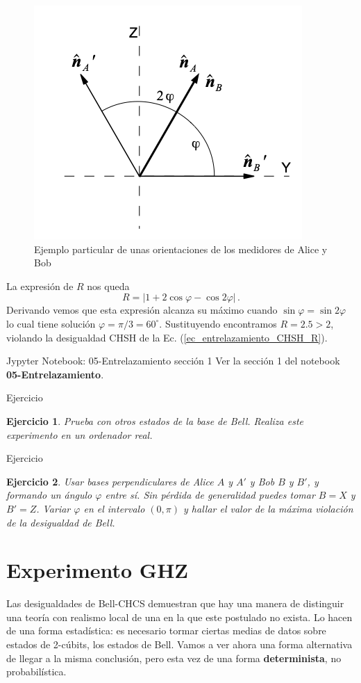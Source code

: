 \documentclass[a4paper,11pt]{book} %
\newtheorem{ejercicio_contador}{Ejercicio}
\newcommand{\Ejercicio}[1]{
		\begin{mybox_gray}{Ejercicio} 
			\begin{ejercicio_contador}
				 #1 
			\end{ejercicio_contador} 
		\end{mybox_gray}
	}
\numberwithin{equation}{chapter}
\begin{document}
	\begin{figure}[t]
	\centering 
	\includegraphics[width=0.35\linewidth]{Figuras/Fig_entrelazamiento_CHSH_basis}
	\caption{Ejemplo particular de unas orientaciones de los medidores de Alice y Bob}
	\label{Fig_entrelazamiento_CHSH_basis}
	\end{figure}

La expresión de $R$ nos queda
$$
R = |1 +  2 \cos\varphi  - \cos 2\varphi|\, .
$$
Derivando vemos que esta expresión alcanza su máximo cuando $\sin\varphi = \sin 2\varphi$ lo cual tiene solución $\varphi = \pi/3 = 60^\circ$. Sustituyendo encontramos $R= 2.5>2$, violando la desigualdad CHSH de la Ec. (\ref{ec_entrelazamiento_CHSH_R}).

	\begin{mybox_orange}{Jypyter Notebook: 05-Entrelazamiento sección 1}
	Ver la sección 1 del notebook \textbf{05-Entrelazamiento}.
	\end{mybox_orange}
	
	\Ejercicio{
	Prueba con otros estados de la base de Bell. Realiza este experimento en un ordenador real.
	}
	
	\Ejercicio{
	Usar bases perpendiculares de  Alice $A$ y $A'$  y Bob $B$ y $B'$, y formando un ángulo $\varphi$ entre sí. Sin pérdida de generalidad puedes tomar $B = X$ y $B' = Z$. Variar $\varphi$ en el intervalo $(0,\pi)$ y hallar el valor de la máxima violación de la desigualdad de Bell.
	}

    \section{Experimento GHZ}

Las desigualdades de Bell-CHCS demuestran que hay una manera de distinguir una teoría con  realismo local de una en la que este postulado no  exista. Lo hacen de una forma estadística: es necesario tormar ciertas medias de datos sobre estados de 2-cúbits, los  estados de Bell. Vamos a ver ahora una forma alternativa de llegar a la misma conclusión, pero esta vez de una forma \textbf{determinista}, no probabilística.
\end{document}
